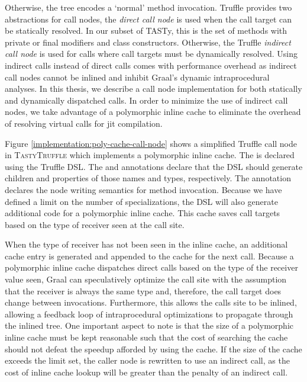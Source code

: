 Otherwise, the  tree encodes a `normal' method invocation.
Truffle provides two abstractions for call nodes, the \textit{direct call node} is used when the call target can be statically resolved. 
In our subset of TASTy, this is the set of methods with private or final modifiers\cite{java:lang-spec} and class constructors. 
Otherwise, the Truffle \textit{indirect call node} is used for calls where call targets must be dynamically resolved. 
Using indirect calls instead of direct calls comes with performance overhead as indirect call nodes cannot be inlined and inhibit Graal's dynamic intraprocedural analyses.
In this thesis, we describe a call node implementation for both statically and dynamically dispatched calls. 
In order to minimize the use of indirect call nodes, we take advantage of a polymorphic inline cache\cite{self:polymorphic-inline-caches} to eliminate the overhead of resolving virtual calls for \acrshort{jit} compilation. 

Figure \ref{implementation:poly-cache-call-node} shows a simplified Truffle call node in \textsc{TastyTruffle} which implements a polymorphic inline cache.
The  is declared using the Truffle DSL.
The  and  annotations declare that the DSL should generate children and properties of those names and types, respectively. 
The  annotation declares the node writing semantics for method invocation.
Because we have defined a limit on the number of specializations, the DSL will also generate additional code for a polymorphic inline cache.
This cache saves call targets based on the type of receiver seen at the call site. 

When the type of receiver has not been seen in the inline cache, an additional cache entry is generated and appended to the cache for the next call.
Because a polymorphic inline cache dispatches direct calls based on the type of the receiver value seen, Graal can speculatively optimize the call site with the assumption that the receiver is always the same type and, therefore, the call target does change between invocations.
Furthermore, this allows the calls site to be inlined, allowing a feedback loop of intraprocedural optimizations\cite{conditional-constant-prop}\cite{variable-congruence} to propagate through the inlined tree.
One important aspect to note is that the size of a polymorphic inline cache must be kept reasonable such that the cost of searching the cache should not defeat the speedup afforded by using the cache.
If the size of the cache exceeds the limit set, the caller node is rewritten to use an indirect call, as the cost of inline cache lookup will be greater than the penalty of an indirect call. 

